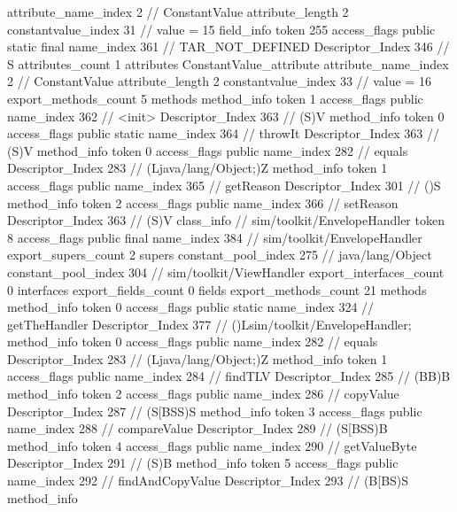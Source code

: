 {{{{{{{					attribute_name_index	2		// ConstantValue
					attribute_length	2
					constantvalue_index	31		// value = 15
				}
				}
			}
			field_info {
				token	255
				access_flags	public static final
				name_index	361		// TAR_NOT_DEFINED
				Descriptor_Index	346		// S
				attributes_count	1
				attributes {
				ConstantValue_attribute {
					attribute_name_index	2		// ConstantValue
					attribute_length	2
					constantvalue_index	33		// value = 16
				}
				}
			}
			}
			export_methods_count	5
			methods {
				method_info {
					token	1
					access_flags	public
					name_index	362		// <init>
					Descriptor_Index	363		// (S)V
				}
				method_info {
					token	0
					access_flags	public static
					name_index	364		// throwIt
					Descriptor_Index	363		// (S)V
				}
				method_info {
					token	0
					access_flags	public
					name_index	282		// equals
					Descriptor_Index	283		// (Ljava/lang/Object;)Z
				}
				method_info {
					token	1
					access_flags	public
					name_index	365		// getReason
					Descriptor_Index	301		// ()S
				}
				method_info {
					token	2
					access_flags	public
					name_index	366		// setReason
					Descriptor_Index	363		// (S)V
				}
			}
		}
		class_info {		// sim/toolkit/EnvelopeHandler
			token	8
			access_flags	public final
			name_index	384		// sim/toolkit/EnvelopeHandler
			export_supers_count	2
			supers {
				constant_pool_index	275		// java/lang/Object
				constant_pool_index	304		// sim/toolkit/ViewHandler
			}
			export_interfaces_count	0
			interfaces {
			}
			export_fields_count	0
			fields {
			}
			export_methods_count	21
			methods {
				method_info {
					token	0
					access_flags	public static
					name_index	324		// getTheHandler
					Descriptor_Index	377		// ()Lsim/toolkit/EnvelopeHandler;
				}
				method_info {
					token	0
					access_flags	public
					name_index	282		// equals
					Descriptor_Index	283		// (Ljava/lang/Object;)Z
				}
				method_info {
					token	1
					access_flags	public
					name_index	284		// findTLV
					Descriptor_Index	285		// (BB)B
				}
				method_info {
					token	2
					access_flags	public
					name_index	286		// copyValue
					Descriptor_Index	287		// (S[BSS)S
				}
				method_info {
					token	3
					access_flags	public
					name_index	288		// compareValue
					Descriptor_Index	289		// (S[BSS)B
				}
				method_info {
					token	4
					access_flags	public
					name_index	290		// getValueByte
					Descriptor_Index	291		// (S)B
				}
				method_info {
					token	5
					access_flags	public
					name_index	292		// findAndCopyValue
					Descriptor_Index	293		// (B[BS)S
				}
				method_info {
}}}}}
